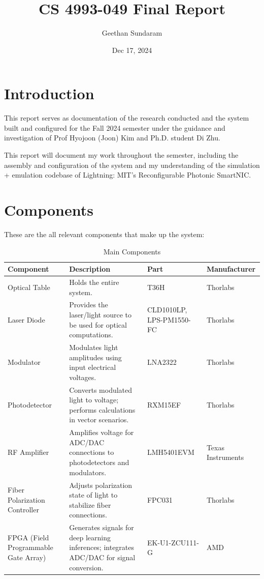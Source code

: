 \documentclass[11pt]{article}
\title{
  CS 4993-049
  Final Report 
}
\author{
  Geethan Sundaram
}
\date{
  Dec 17, 2024
}
\begin{document}
\maketitle


\section{Introduction}

This report serves as documentation of the research conducted and the system built and configured for the Fall 2024 semester under the guidance and investigation of Prof Hyojoon (Joon) Kim and Ph.D. student Di Zhu.

This report will document my work throughout the semester, including the assembly and configuration of the system and my understanding of the simulation + emulation codebase of Lightning: MIT's Reconfigurable Photonic SmartNIC.

\section{Components}

These are the all relevant components that make up the system:

\begin{table}[H]
\centering
\renewcommand{\arraystretch}{1.5}
\setlength{\tabcolsep}{6pt} %
\begin{tabular}{|p{}|p{}|p{}|p{}|}
\hline
\textbf{Component} & \textbf{Description} & \textbf{Part} & \textbf{Manufacturer} \\ \hline
Optical Table & Holds the entire system. & T36H & Thorlabs \\ \hline
Laser Diode & Provides the laser/light source to be used for optical computations. & CLD1010LP, LPS-PM1550-FC & Thorlabs \\ \hline
Modulator & Modulates light amplitudes using input electrical voltages. & LNA2322 & Thorlabs \\ \hline
Photodetector & Converts modulated light to voltage; performs calculations in vector scenarios. & RXM15EF & Thorlabs \\ \hline
RF Amplifier & Amplifies voltage for ADC/DAC connections to photodetectors and modulators. & LMH5401EVM & Texas Instruments \\ \hline
Fiber Polarization Controller & Adjusts polarization state of light to stabilize fiber connections. & FPC031 & Thorlabs \\ \hline
FPGA (Field Programmable Gate Array) & Generates signals for deep learning inferences; integrates ADC/DAC for signal conversion. & EK-U1-ZCU111-G & AMD \\ \hline
\end{tabular}
\caption{Main Components}
\label{table:components}
\end{table}
\end{document}
